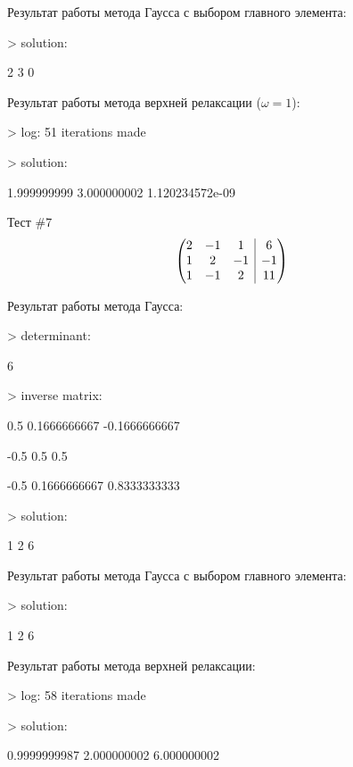 \documentclass[12pt, a4paper]{report}
\makeatletter
\newenvironment{amatrix}[1]{%
        \left(\begin{array}{@{}*{#1}{c}|c@{}}
}{%
        \end{array}\right)
}
\makeatother
\begin{document}
{\vspace{0.25cm}
\normalsize{Результат работы метода Гаусса с выбором главного элемента: \par}
\normalsize{> solution: \par
            2              3            0 \par}
\vspace{0.25cm}
\normalsize{Результат работы метода верхней релаксации ($\omega = 1$): \par}
\normalsize{> log: 51 iterations made \par
            > solution: \par
            1.999999999     3.000000002 1.120234572e-09 \par}
\vspace{1cm}

\large{Тест \#7}
\[\begin{amatrix}{3}
        2 & -1 &  1 &  6 \\
        1 &  2 & -1 & -1 \\
        1 & -1 &  2 & 11 \\
\end{amatrix}\]

\normalsize{Результат работы метода Гаусса: \par}
\normalsize{> determinant: \par
            6 \par
            > inverse matrix: \par
                       0.5    0.1666666667   -0.1666666667 \par
                      -0.5             0.5             0.5 \par
                      -0.5    0.1666666667    0.8333333333 \par
            > solution: \par
                         1               2               6 \par}
\vspace{0.25cm}
\normalsize{Результат работы метода Гаусса с выбором главного элемента: \par}
\normalsize{> solution: \par
            1              2            6 \par}
\vspace{0.25cm}
\normalsize{Результат работы метода верхней релаксации: \par}
\normalsize{> log: 58 iterations made \par
            > solution: \par
            0.9999999987     2.000000002     6.000000002 \par}
\vspace{1cm}
            
}
\end{document}
